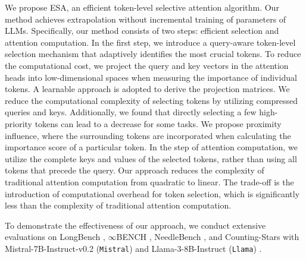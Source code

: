 We propose ESA, an efficient token-level selective attention algorithm. Our method achieves extrapolation without incremental training of parameters of LLMs. Specifically, our method consists of two steps: efficient selection and attention computation. 
In the first step, we introduce a query-aware token-level selection mechanism that adaptively identifies the most crucial tokens.
To reduce the computational cost, we project the query and key vectors in the attention heads into low-dimensional spaces when measuring the importance of individual tokens. A learnable approach is adopted to derive the projection matrices.
We reduce the computational complexity of selecting tokens by utilizing compressed queries and keys.
Additionally, we found that directly selecting a few high-priority tokens can lead to a decrease for some tasks. We propose proximity influence, where the surrounding tokens are incorporated when calculating the importance score of a particular token.
In the step of attention computation, we utilize the complete keys and values of the selected tokens, rather than using all tokens that precede the query. Our approach reduces the complexity of traditional attention computation from quadratic to linear. The trade-off is the introduction of computational overhead for token selection, which is significantly less than the complexity of traditional attention computation.

To demonstrate the effectiveness of our approach, we conduct extensive evaluations on LongBench \citep{bai2023longbench},
$\infty$BENCH \citep{zhang2024bench}, NeedleBench \citep{li2024needlebench}, and Counting-Stars \citep{song2024counting} with Mistral-7B-Instruct-v0.2 (\texttt{Mistral}) \citep{jiang2023mistral} and Llama-3-8B-Instruct (\texttt{Llama}) \citep{llama3modelcard}.

